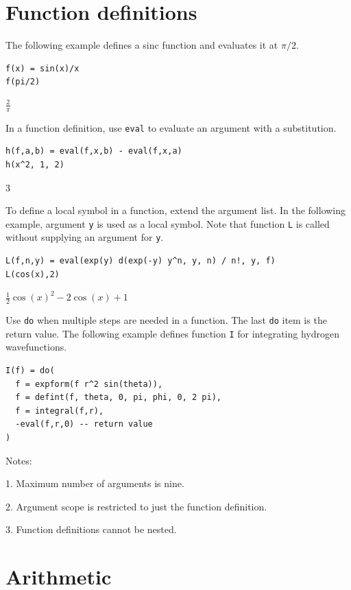 \documentclass[12pt]{article}
\begin{document}
\newpage

\section{Function definitions}

The following example defines a sinc function and evaluates it at $\pi/2$.

{\color{blue}
\begin{verbatim}
f(x) = sin(x)/x
f(pi/2)
\end{verbatim}}

$\displaystyle \frac{2}{\pi}$

\bigskip
In a function definition, use \verb$eval$ to evaluate an argument with a substitution.

{\color{blue}
\begin{verbatim}
h(f,a,b) = eval(f,x,b) - eval(f,x,a)
h(x^2, 1, 2)
\end{verbatim}}

$3$

\bigskip
To define a local symbol in a function, extend the argument list.
In the following example, argument \verb$y$ is used as a local symbol.
Note that function \verb$L$ is called without supplying an argument for \verb$y$.

{\color{blue}
\begin{verbatim}
L(f,n,y) = eval(exp(y) d(exp(-y) y^n, y, n) / n!, y, f)
L(cos(x),2)
\end{verbatim}
}

$\displaystyle \tfrac{1}{2}\cos(x)^2-2\cos(x)+1$

\bigskip
Use \verb$do$ when multiple steps are needed in a function.
The last \verb$do$ item is the return value.
The following example defines function \verb$I$ for
integrating hydrogen wavefunctions.

{\color{blue}
\begin{verbatim}
I(f) = do(
  f = expform(f r^2 sin(theta)),
  f = defint(f, theta, 0, pi, phi, 0, 2 pi),
  f = integral(f,r),
  -eval(f,r,0) -- return value
)
\end{verbatim}}

Notes:

1. Maximum number of arguments is nine.

2. Argument scope is restricted to just the function definition.

3. Function definitions cannot be nested.

\newpage

\section{Arithmetic}
\end{document}

